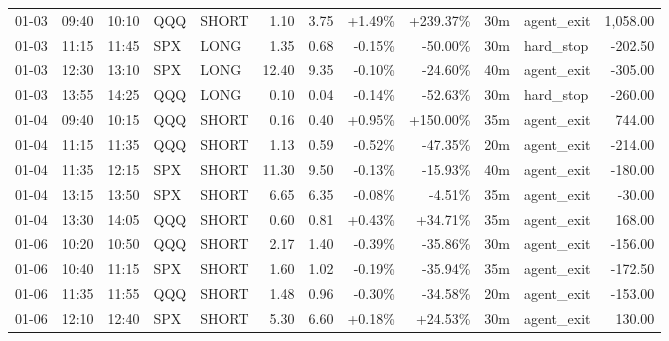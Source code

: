 \documentclass[11pt,a4paper,twoside]{article}
\begin{document}
\begin{center}
\begin{longtable}{>{\color{txtmain}}l l l l l r r r r r >{\color{txtmain}}l r}
01-03 & 09:40 & 10:10 & QQQ & SHORT & 1.10 & 3.75 & \textcolor{wingreen}{+1.49\%} & \textcolor{wingreen}{+239.37\%} & 30m & agent\_exit & \textcolor{wingreen}{1,058.00} \\
01-03 & 11:15 & 11:45 & SPX & LONG & 1.35 & 0.68 & \textcolor{lossred}{-0.15\%} & \textcolor{lossred}{-50.00\%} & 30m & hard\_stop & \textcolor{lossred}{-202.50} \\
01-03 & 12:30 & 13:10 & SPX & LONG & 12.40 & 9.35 & \textcolor{lossred}{-0.10\%} & \textcolor{lossred}{-24.60\%} & 40m & agent\_exit & \textcolor{lossred}{-305.00} \\
01-03 & 13:55 & 14:25 & QQQ & LONG & 0.10 & 0.04 & \textcolor{lossred}{-0.14\%} & \textcolor{lossred}{-52.63\%} & 30m & hard\_stop & \textcolor{lossred}{-260.00} \\
01-04 & 09:40 & 10:15 & QQQ & SHORT & 0.16 & 0.40 & \textcolor{wingreen}{+0.95\%} & \textcolor{wingreen}{+150.00\%} & 35m & agent\_exit & \textcolor{wingreen}{744.00} \\
01-04 & 11:15 & 11:35 & QQQ & SHORT & 1.13 & 0.59 & \textcolor{lossred}{-0.52\%} & \textcolor{lossred}{-47.35\%} & 20m & agent\_exit & \textcolor{lossred}{-214.00} \\
01-04 & 11:35 & 12:15 & SPX & SHORT & 11.30 & 9.50 & \textcolor{lossred}{-0.13\%} & \textcolor{lossred}{-15.93\%} & 40m & agent\_exit & \textcolor{lossred}{-180.00} \\
01-04 & 13:15 & 13:50 & SPX & SHORT & 6.65 & 6.35 & \textcolor{lossred}{-0.08\%} & \textcolor{lossred}{-4.51\%} & 35m & agent\_exit & \textcolor{lossred}{-30.00} \\
01-04 & 13:30 & 14:05 & QQQ & SHORT & 0.60 & 0.81 & \textcolor{wingreen}{+0.43\%} & \textcolor{wingreen}{+34.71\%} & 35m & agent\_exit & \textcolor{wingreen}{168.00} \\
01-06 & 10:20 & 10:50 & QQQ & SHORT & 2.17 & 1.40 & \textcolor{lossred}{-0.39\%} & \textcolor{lossred}{-35.86\%} & 30m & agent\_exit & \textcolor{lossred}{-156.00} \\
01-06 & 10:40 & 11:15 & SPX & SHORT & 1.60 & 1.02 & \textcolor{lossred}{-0.19\%} & \textcolor{lossred}{-35.94\%} & 35m & agent\_exit & \textcolor{lossred}{-172.50} \\
01-06 & 11:35 & 11:55 & QQQ & SHORT & 1.48 & 0.96 & \textcolor{lossred}{-0.30\%} & \textcolor{lossred}{-34.58\%} & 20m & agent\_exit & \textcolor{lossred}{-153.00} \\
01-06 & 12:10 & 12:40 & SPX & SHORT & 5.30 & 6.60 & \textcolor{wingreen}{+0.18\%} & \textcolor{wingreen}{+24.53\%} & 30m & agent\_exit & \textcolor{wingreen}{130.00} \\

\end{longtable}
\end{center}
\end{document}
